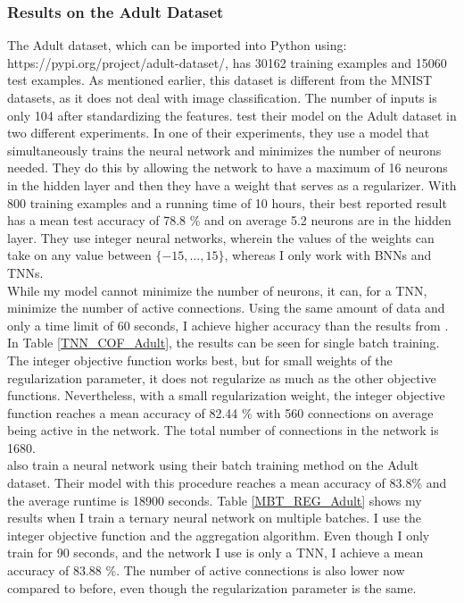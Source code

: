 \subsubsection{Results on the Adult Dataset}
The Adult dataset, which can be imported into Python using: https://pypi.org/project/adult-dataset/, has 30162 training examples and 15060 test examples. As mentioned earlier, this dataset is different from the MNIST datasets, as it does not deal with image classification. The number of inputs is only 104 after standardizing the features. \cite{thorbjarnason2023} test their model on the Adult dataset in two different experiments. In one of their experiments, they use a model that simultaneously trains the neural network and minimizes the number of neurons needed. They do this by allowing the network to have a maximum of 16 neurons in the hidden layer and then they have a weight that serves as a regularizer. With 800 training examples and a running time of 10 hours, their best reported result has a mean test accuracy of 78.8 \% and on average 5.2 neurons are in the hidden layer. They use integer neural networks, wherein the values of the weights can take on any value between $\{-15, \ldots, 15\}$, whereas I only work with BNNs and TNNs. \\

\noindent While my model cannot minimize the number of neurons, it can, for a TNN, minimize the number of active connections. Using the same amount of data and only a time limit of 60 seconds, I achieve higher accuracy than the results from \cite{thorbjarnason2023}. In Table \ref{TNN_COF_Adult}, the results can be seen for single batch training. The integer objective function works best, but for small weights of the regularization parameter, it does not regularize as much as the other objective functions. Nevertheless, with a small regularization weight, the integer objective function reaches a mean accuracy of 82.44 \% with 560 connections on average being active in the network. The total number of connections in the network is 1680. \\

\noindent \cite{thorbjarnason2023} also train a neural network using their batch training method on the Adult dataset. Their model with this procedure reaches a mean accuracy of 83.8\% and the average runtime is 18900 seconds. Table \ref{MBT_REG_Adult} shows my results when I train a ternary neural network on multiple batches. I use the integer objective function and the aggregation algorithm. Even though I only train for 90 seconds, and the network I use is only a TNN, I achieve a mean accuracy of 83.88 \%. The number of active connections is also lower now compared to before, even though the regularization parameter is the same. 





